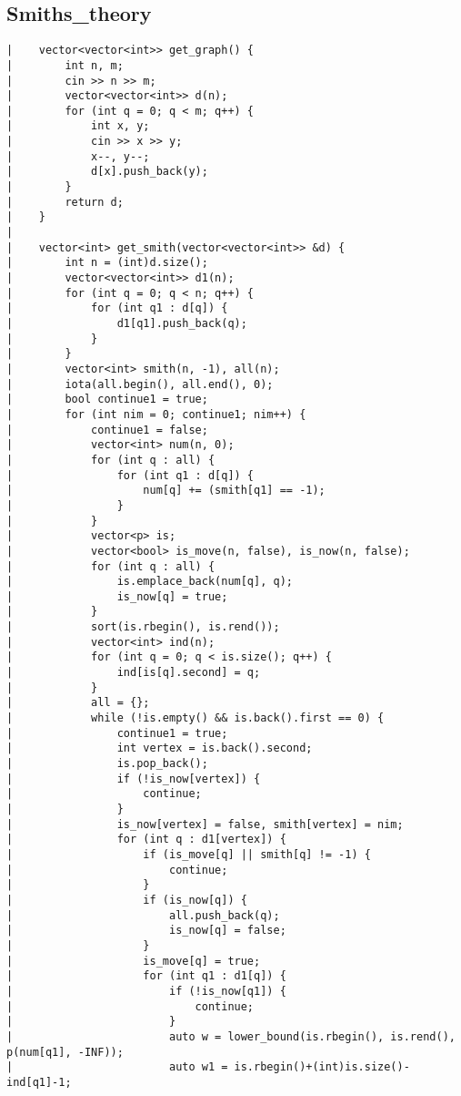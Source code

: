 \documentclass[a4paper, 10pt]{article}
\begin{document}
\begin{center}
\section*{Smiths\_theory}
\begin{verbatim}
|    vector<vector<int>> get_graph() {
|        int n, m;
|        cin >> n >> m;
|        vector<vector<int>> d(n);
|        for (int q = 0; q < m; q++) {
|            int x, y;
|            cin >> x >> y;
|            x--, y--;
|            d[x].push_back(y);
|        }
|        return d;
|    }
|    
|    vector<int> get_smith(vector<vector<int>> &d) {
|        int n = (int)d.size();
|        vector<vector<int>> d1(n);
|        for (int q = 0; q < n; q++) {
|            for (int q1 : d[q]) {
|                d1[q1].push_back(q);
|            }
|        }
|        vector<int> smith(n, -1), all(n);
|        iota(all.begin(), all.end(), 0);
|        bool continue1 = true;
|        for (int nim = 0; continue1; nim++) {
|            continue1 = false;
|            vector<int> num(n, 0);
|            for (int q : all) {
|                for (int q1 : d[q]) {
|                    num[q] += (smith[q1] == -1);
|                }
|            }
|            vector<p> is;
|            vector<bool> is_move(n, false), is_now(n, false);
|            for (int q : all) {
|                is.emplace_back(num[q], q);
|                is_now[q] = true;
|            }
|            sort(is.rbegin(), is.rend());
|            vector<int> ind(n);
|            for (int q = 0; q < is.size(); q++) {
|                ind[is[q].second] = q;
|            }
|            all = {};
|            while (!is.empty() && is.back().first == 0) {
|                continue1 = true;
|                int vertex = is.back().second;
|                is.pop_back();
|                if (!is_now[vertex]) {
|                    continue;
|                }
|                is_now[vertex] = false, smith[vertex] = nim;
|                for (int q : d1[vertex]) {
|                    if (is_move[q] || smith[q] != -1) {
|                        continue;
|                    }
|                    if (is_now[q]) {
|                        all.push_back(q);
|                        is_now[q] = false;
|                    }
|                    is_move[q] = true;
|                    for (int q1 : d1[q]) {
|                        if (!is_now[q1]) {
|                            continue;
|                        }
|                        auto w = lower_bound(is.rbegin(), is.rend(), p(num[q1], -INF));
|                        auto w1 = is.rbegin()+(int)is.size()-ind[q1]-1;

\end{verbatim}
\end{center}
\end{document}
